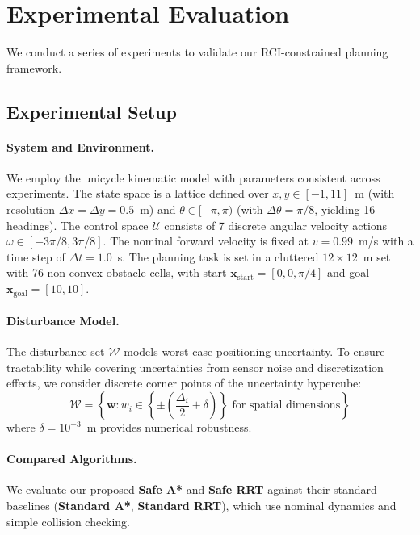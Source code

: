 \documentclass[conference]{IEEEtran}
\begin{document}
\section{Experimental Evaluation}
\label{sec:experiments}
We conduct a series of experiments to validate our RCI-constrained planning framework.

\subsection{Experimental Setup}

\paragraph{System and Environment.}
We employ the unicycle kinematic model with parameters consistent across experiments. The state space is a lattice defined over $x,y \in [-1,11]$~m (with resolution $\Delta x=\Delta y=0.5$~m) and $\theta \in [-\pi,\pi)$ (with $\Delta\theta=\pi/8$, yielding 16 headings). The control space $\mathcal{U}$ consists of 7 discrete angular velocity actions $\omega \in [-3\pi/8, 3\pi/8]$. The nominal forward velocity is fixed at $v=0.99$~m/s with a time step of $\Delta t=1.0$~s. The planning task is set in a cluttered $12 \times 12$~m set with 76 non-convex obstacle cells, with start $\mathbf{x}_{\text{start}}=[0,0,\pi/4]$ and goal $\mathbf{x}_{\text{goal}}=[10,10]$.

\paragraph{Disturbance Model.}
The disturbance set $\mathcal{W}$ models worst-case positioning uncertainty. To ensure tractability while covering uncertainties from sensor noise and discretization effects, we consider discrete corner points of the uncertainty hypercube:
\begin{equation}
\mathcal{W} = \left\{\mathbf{w} : w_i \in \left\{\pm\left(\frac{\Delta_i}{2}+\delta\right)\right\} \text{ for spatial dimensions}\right\}
\end{equation}
where $\delta=10^{-3}$~m provides numerical robustness.


\paragraph{Compared Algorithms.}
We evaluate our proposed \textbf{Safe A*} and \textbf{Safe RRT} against their standard baselines (\textbf{Standard A*}, \textbf{Standard RRT}), which use nominal dynamics and simple collision checking.
\end{document}
